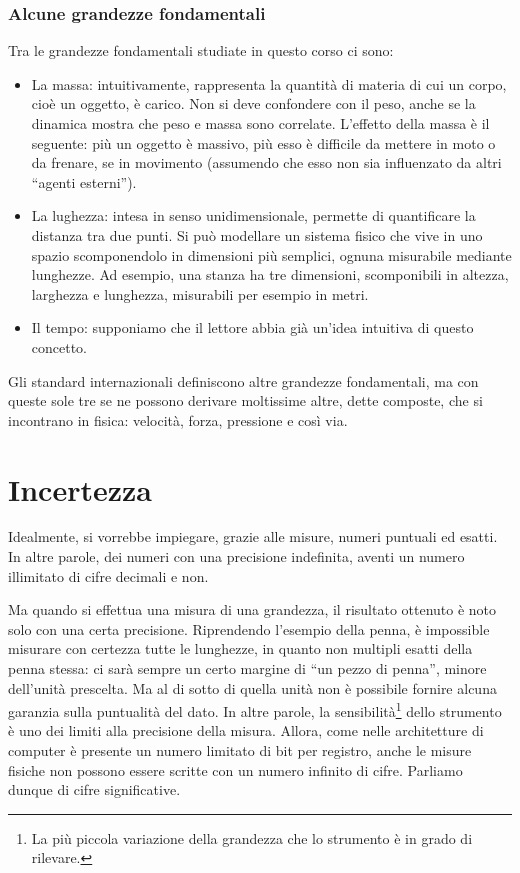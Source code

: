 \subsubsection{Alcune grandezze fondamentali}
Tra le grandezze fondamentali studiate in questo corso ci sono:
\begin{itemize}
    \item La massa: intuitivamente, rappresenta la quantità di
    materia di cui un corpo, cioè un oggetto, è carico. Non si
    deve confondere con il peso, anche se la dinamica mostra che
    peso e massa sono correlate. L'effetto della massa è il seguente:
    più un oggetto è massivo, più
    esso è difficile da mettere in moto o da frenare, se in
    movimento (assumendo che esso non sia influenzato da altri
    ``agenti esterni'').

    \item La lughezza: intesa in senso unidimensionale, permette
    di quantificare la distanza tra due punti. Si può modellare
    un sistema fisico che vive in uno spazio scomponendolo in
    dimensioni più semplici, ognuna misurabile mediante lunghezze.
    Ad esempio, una stanza ha tre dimensioni, scomponibili in
    altezza, larghezza e lunghezza, misurabili per esempio in
    metri.

    \item Il tempo: supponiamo che il lettore abbia già un'idea
    intuitiva di questo concetto.
\end{itemize}

\noindent Gli standard internazionali definiscono altre grandezze
fondamentali, ma con queste sole tre se ne possono derivare moltissime
altre, dette composte, che si incontrano in fisica: velocità, forza,
pressione e così via.

\section{Incertezza}
Idealmente, si vorrebbe impiegare, grazie alle misure, numeri puntuali ed esatti.
In altre parole, dei numeri con una precisione indefinita, aventi un numero
illimitato di cifre decimali e non.

Ma quando si effettua una misura di una grandezza, il risultato ottenuto è noto solo
con una certa precisione. Riprendendo l'esempio della penna, è impossible
misurare con certezza tutte le lunghezze, in quanto non multipli esatti della
penna stessa: ci sarà sempre un certo margine di ``un pezzo di penna'',
minore dell'unità prescelta. Ma al di sotto di quella unità non è possibile
fornire alcuna garanzia sulla puntualità del dato. In altre parole, la
sensibilità\footnote{La più piccola variazione della grandezza che lo
strumento è in grado di rilevare.} dello strumento è uno dei limiti alla precisione
della misura. Allora, come nelle architetture di computer è presente un
numero limitato di bit per registro, anche le misure fisiche non possono
essere scritte con un numero infinito di cifre. Parliamo dunque di cifre
significative.

